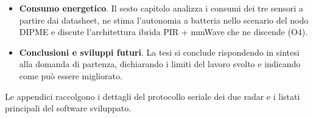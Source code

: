 \begin{itemize}[leftmargin=1.4em,itemsep=4pt]
  \item \textbf{Consumo energetico}. Il sesto capitolo analizza i consumi dei tre
    sensori a partire dai datasheet, ne stima l'autonomia a batteria nello scenario
    del nodo DIPME e discute l'architettura ibrida PIR + mmWave che ne discende (O4).

  \item \textbf{Conclusioni e sviluppi futuri}. La tesi si conclude rispondendo in
    sintesi alla domanda di partenza, dichiarando i limiti del lavoro svolto e
    indicando come può essere migliorato.
\end{itemize}

Le appendici raccolgono i dettagli del protocollo seriale dei due radar e i listati
principali del software sviluppato.
